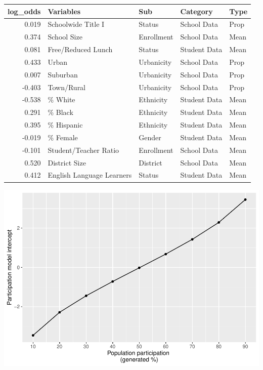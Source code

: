 \documentclass[
  english,
  man,floatsintext]{apa6}
\begin{document}
\begin{table}[H]
\centering
\begin{tabular}{r|l|l|l|l}
\hline
log\_odds & Variables & Sub & Category & Type\\
\hline
0.019 & Schoolwide Title I & Status & School Data & Prop\\
\hline
0.374 & School Size & Enrollment & School Data & Mean\\
\hline
0.081 & Free/Reduced Lunch & Status & Student Data & Mean\\
\hline
0.433 & Urban & Urbanicity & School Data & Prop\\
\hline
0.007 & Suburban & Urbanicity & School Data & Prop\\
\hline
-0.403 & Town/Rural & Urbanicity & School Data & Prop\\
\hline
-0.538 & \% White & Ethnicity & Student Data & Mean\\
\hline
0.291 & \% Black & Ethnicity & Student Data & Mean\\
\hline
0.395 & \% Hispanic & Ethnicity & Student Data & Mean\\
\hline
-0.019 & \% Female & Gender & Student Data & Mean\\
\hline
-0.101 & Student/Teacher Ratio & Enrollment & School Data & Mean\\
\hline
0.520 & District Size & District & School Data & Mean\\
\hline
0.412 & English Language Learners & Status & Student Data & Mean\\
\hline
\end{tabular}
\end{table}

\includegraphics{5---Analysis_files/figure-latex/unnamed-chunk-11-1.pdf}
\end{document}
